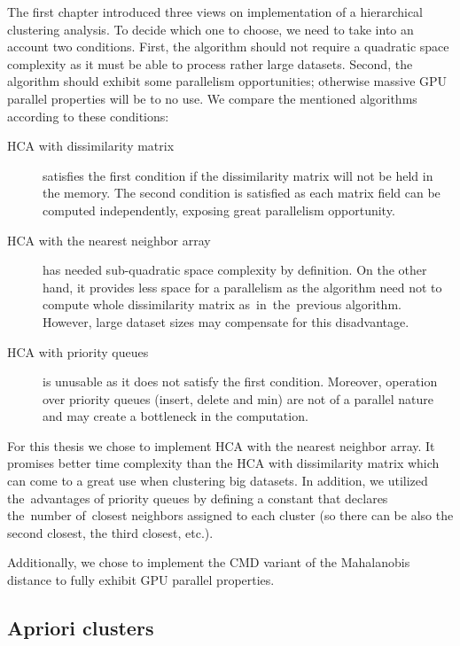 The first chapter introduced three views on implementation of a hierarchical clustering analysis. To decide which one to choose, we need to take into an account two conditions. First, the algorithm should not require a quadratic space complexity as it must be able to process rather large datasets. Second, the algorithm should exhibit some parallelism opportunities; otherwise massive GPU parallel properties will be to no use.  We compare the mentioned algorithms according to these conditions:
\begin{description}

\item[HCA with dissimilarity matrix] satisfies the first condition if the dissimilarity matrix will not be held in the memory. The second condition is satisfied as each matrix field can be computed independently, exposing great parallelism opportunity. 

\item[HCA with the nearest neighbor array] has needed sub-quadratic space complexity by definition. On the other hand, it provides less space for a parallelism as the algorithm need not to compute whole dissimilarity matrix as~in~the~previous algorithm. However, large dataset sizes may compensate for this disadvantage. 

\item[HCA with priority queues] is unusable as it does not satisfy the first condition. Moreover, operation over priority queues (insert, delete and min) are not of a parallel nature and may create a bottleneck in the computation.

\end{description}

For this thesis we chose to implement HCA with the nearest neighbor array. It promises better time complexity than the HCA with dissimilarity matrix which can come to a great use when clustering big datasets. In addition, we utilized the~advantages of priority queues by defining a constant that declares the~number of~closest neighbors assigned to each cluster (so there can be also the second closest, the third closest, etc.).

Additionally, we chose to implement the CMD variant of the Mahalanobis distance to fully exhibit GPU parallel properties.

\subsection{Apriori clusters}

